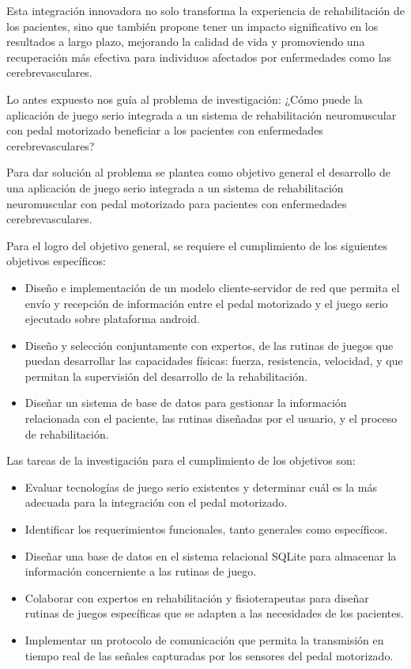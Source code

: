 \begin{introduction}
    Esta integración innovadora no solo transforma la experiencia de rehabilitación de los pacientes, sino que también propone tener un impacto significativo en los resultados a largo plazo, mejorando la calidad de vida y promoviendo una recuperación más efectiva para individuos afectados por enfermedades como las cerebrevasculares.

    Lo antes expuesto nos guía al problema de investigación: ¿Cómo puede la aplicación de juego serio integrada a un sistema de rehabilitación neuromuscular con pedal motorizado beneficiar a los pacientes con enfermedades cerebrevasculares?

    Para dar solución al problema se plantea como objetivo general el desarrollo de una aplicación de juego serio integrada a un sistema de rehabilitación neuromuscular con pedal motorizado para pacientes con enfermedades cerebrevasculares.
    
    Para el logro del objetivo general, se requiere el cumplimiento de los siguientes objetivos específicos:

    \begin{itemize}
        \item Diseño e implementación de un modelo cliente-servidor de red que permita el envío y recepción de información entre el pedal motorizado y el juego serio ejecutado sobre plataforma android.
        \item  Diseño y selección conjuntamente con expertos, de las rutinas de juegos que puedan desarrollar las capacidades físicas: fuerza, resistencia, velocidad, y que
        permitan la supervisión del desarrollo de la rehabilitación.
        \item Diseñar un sistema de base de datos para gestionar la información relacionada con el paciente, las rutinas diseñadas por el usuario, y el proceso de
        rehabilitación.
    \end{itemize}

    Las tareas de la investigación para el cumplimiento de los objetivos son:
    \begin{itemize}
        \item Evaluar tecnologías de juego serio existentes y determinar cuál es la más adecuada para la integración con el pedal motorizado.
        \item Identificar los requerimientos funcionales, tanto generales como específicos.
        \item Diseñar una base de datos en el sistema relacional SQLite para almacenar la información concerniente a las rutinas de juego. 
        \item Colaborar con expertos en rehabilitación y fisioterapeutas para diseñar rutinas de juegos específicas que se adapten a las necesidades de los pacientes.
        \item Implementar un protocolo de comunicación que permita la transmisión en tiempo real de las señales capturadas por los sensores del pedal motorizado. 
    \end{itemize}


\end{introduction}

